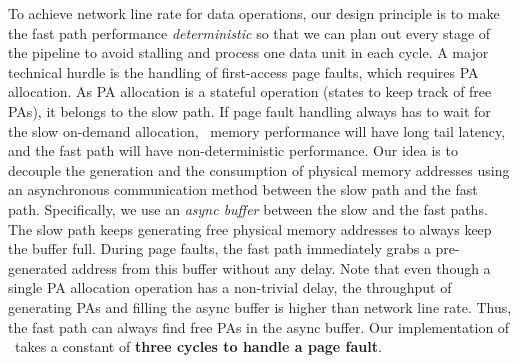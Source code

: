 To achieve network line rate for data operations,
our design principle is to make the fast path performance {\em deterministic} 
so that we can plan out every stage of the pipeline to avoid stalling and process one data unit in each cycle.
A major technical hurdle is the handling of first-access page faults, which requires PA allocation.
As PA allocation is a stateful operation (states to keep track of free PAs), it belongs to the slow path.
If page fault handling always has to wait for the slow on-demand allocation,
\sys\ memory performance will have long tail latency, and the fast path will have non-deterministic performance.
Our idea is to decouple the generation and the consumption of physical memory addresses
using an asynchronous communication method between the slow path and the fast path.
Specifically, we use an \textit{async buffer} between the slow and the fast paths.
The slow path keeps generating free physical memory addresses to always keep the buffer full.
During page faults, the fast path immediately grabs a pre-generated address from this buffer without any delay.
Note that even though a single PA allocation operation has a non-trivial delay, 
the throughput of generating PAs and filling the async buffer is higher than network line rate.
Thus, the fast path can always find free PAs in the async buffer.
Our implementation of \sysboard\ takes a constant of \textbf{three cycles to handle a page fault}.





